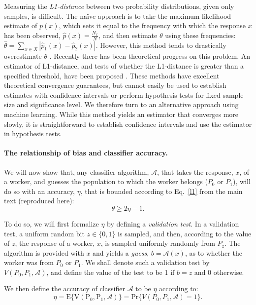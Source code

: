 \documentclass[12pt]{article}
\begin{document}
Measuring the \textit{L1-distance} between two probability distributions,
given only samples, is difficult.  The na\"ive approach is to take
the maximum likelihood estimate of $p(x)$, which sets it equal to the 
frequency with which the response $x$ has been observed, 
$\hat{p}(x) = \frac{N_x}{N}$, and then estimate $\theta$ 
using these frequencies\cite{batu2013testing}: 
$\hat{\theta} = \sum_{x \in X}|\hat{p}_1(x) - \hat{p}_2(x)|$.  
However, this method tends to drastically overestimate $\theta$
\cite{val-thesis}.
Recently there has been theoretical progress on this problem.
An estimator of L1-distance, and tests of whether the L1-distance is
greater than a specified threshold, have been proposed 
\cite{val-thesis,batu2013testing,chan2014optimal}.  
These methods have excellent theoretical convergence guarantees, but
cannot easily be used to establish estimates with confidence intervals or 
perform hypothesis tests for fixed sample size and significance level.  
We therefore turn to an alternative approach using machine learning. 
While this method yields an estimator that converges more slowly,
it is straightforward to establish confidence intervals and 
use the estimator in hypothesis tests.

\paragraph{The relationship of bias and classifier accuracy.}
We will now show that, any classifier algorithm, $\mathcal{A}$, that
takes the response, $x$, of a worker, and guesses the population to which
the worker belongs ($P_0$ or $P_1$), will do so with an accuracy, $\eta$,
that is bounded according to Eq.~\ref{l1} from the main text 
(reproduced here):
\begin{equation}
	\theta \geq 2\eta - 1.
	\label{eq:sup:l1}
\end{equation}

To do so, we will first formalize $\eta$ by defining a 
\textit{validation test}.  In a validation test, a uniform random bit 
$z\in\{0,1\}$ is sampled, and then, according to the value of $z$, the
response of a worker, $x$, is sampled uniformly randomly from $P_z$.  
The algorithm is provided
with $x$ and yields a \textit{guess}, $b=\mathcal{A}(x)$, as to whether the 
worker was 
from $P_0$ or $P_1$.  We shall denote such a validation test by 
$V(P_0, P_1, \mathcal{A})$, and define the value of the test to be 1 if 
$b=z$ and 0 otherwise.  

We then define the accuracy of classifier $\mathcal{A}$ to be $\eta$ according
to:
\begin{equation}
\eta = \mathrm{E\{V(P_0, P_1, \mathcal{A})\}} 
	= \mathrm{Pr}\{V(P_0, P_1, \mathcal{A})=1\}.
\end{equation}
\end{document}
